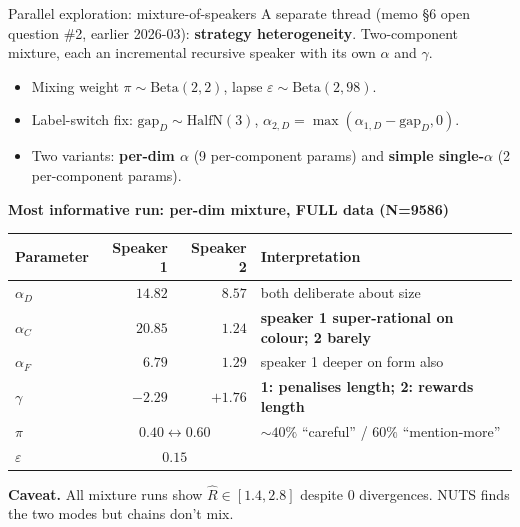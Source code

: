 \documentclass[10pt,aspectratio=169]{beamer}
\newcommand{\main}[1]{\textcolor{CSP-main-dark}{\textbf{#1}}}
\newcommand{\emp}[1]{\textcolor{CSP-emphasis}{\textbf{#1}}}
\begin{document}
\begin{frame}{Parallel exploration: mixture-of-speakers}
\small
A separate thread (memo \S6 open question \#2, earlier 2026-03): \emp{strategy heterogeneity}. Two-component mixture, each an incremental recursive speaker with its own $\alpha$ and $\gamma$.

\vspace{0.4em}
\begin{itemize}\itemsep0.15em
  \item Mixing weight $\pi \sim \mathrm{Beta}(2,2)$, lapse $\varepsilon \sim \mathrm{Beta}(2,98)$.
  \item Label-switch fix: $\mathrm{gap}_D \sim \mathrm{HalfN}(3)$, $\alpha_{2,D} = \max(\alpha_{1,D} - \mathrm{gap}_D, 0)$.
  \item Two variants: \main{per-dim $\alpha$} (9 per-component params) and \main{simple single-$\alpha$} (2 per-component params).
\end{itemize}

\vspace{0.6em}
\main{Most informative run: per-dim mixture, FULL data (N=9586)}
\begin{center}\footnotesize
\begin{tabular}{lrr|l}
\toprule
Parameter & Speaker 1 & Speaker 2 & Interpretation \\
\midrule
$\alpha_D$ & $14.82$ & $8.57$ & both deliberate about size \\
$\alpha_C$ & \main{$20.85$} & \emp{$1.24$} & \main{speaker 1 super-rational on colour; 2 barely} \\
$\alpha_F$ & $6.79$  & $1.29$ & speaker 1 deeper on form also \\
$\gamma$   & \main{$-2.29$} & \emp{$+1.76$} & \main{1: penalises length; 2: rewards length} \\
$\pi$      & \multicolumn{2}{c|}{$0.40 \leftrightarrow 0.60$} & $\sim\!40\%$ ``careful'' / $60\%$ ``mention-more'' \\
$\varepsilon$ & \multicolumn{2}{c|}{$0.15$} & \\
\bottomrule
\end{tabular}
\end{center}

\vspace{0.5em}
\emp{Caveat.} All mixture runs show $\hat R \in [1.4, 2.8]$ despite $0$ divergences. NUTS finds the two modes but chains don't mix.
\end{frame}
\end{document}
